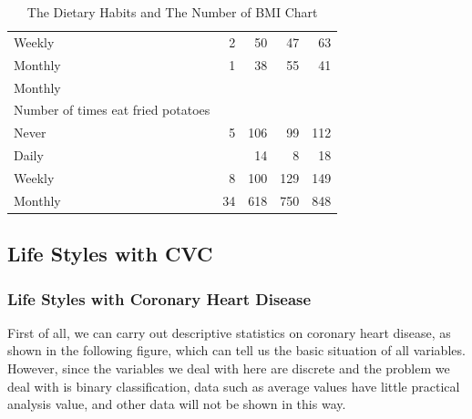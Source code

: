 \documentclass{article}
\begin{document}
\begin{table}[!h]
{\begin{tabular}{lllll}
			\multicolumn{1}{l}{\hspace{5em}Weekly} &
			\multicolumn{1}{|r}{2} &
			\multicolumn{1}{r}{50} &
			\multicolumn{1}{r}{47} &
			\multicolumn{1}{r}{63} \\
			\multicolumn{1}{l}{\hspace{5em}Monthly} &
			\multicolumn{1}{|r}{1} &
			\multicolumn{1}{r}{38} &
			\multicolumn{1}{r}{55} &
			\multicolumn{1}{r}{41} \\
			\multicolumn{1}{l}{\hspace{3em}Monthly} &
			\multicolumn{1}{|r}{} &
			\multicolumn{1}{r}{} &
			\multicolumn{1}{r}{} &
			\multicolumn{1}{r}{} \\
			\multicolumn{1}{l}{\hspace{4em}Number of times eat fried potatoes} &
			\multicolumn{1}{|r}{} &
			\multicolumn{1}{r}{} &
			\multicolumn{1}{r}{} &
			\multicolumn{1}{r}{} \\
			\multicolumn{1}{l}{\hspace{5em}Never} &
			\multicolumn{1}{|r}{5} &
			\multicolumn{1}{r}{106} &
			\multicolumn{1}{r}{99} &
			\multicolumn{1}{r}{112} \\
			\multicolumn{1}{l}{\hspace{5em}Daily} &
			\multicolumn{1}{|r}{} &
			\multicolumn{1}{r}{14} &
			\multicolumn{1}{r}{8} &
			\multicolumn{1}{r}{18} \\
			\multicolumn{1}{l}{\hspace{5em}Weekly} &
			\multicolumn{1}{|r}{8} &
			\multicolumn{1}{r}{100} &
			\multicolumn{1}{r}{129} &
			\multicolumn{1}{r}{149} \\
			\multicolumn{1}{l}{\hspace{5em}Monthly} &
			\multicolumn{1}{|r}{34} &
			\multicolumn{1}{r}{618} &
			\multicolumn{1}{r}{750} &
			\multicolumn{1}{r}{848} \\
			\cline{1-5}
		\end{tabular}
	}
	\caption{The Dietary Habits and The Number of BMI Chart}
	\label{tab:t6}
\end{table}	

\newpage

\subsection{Life Styles with CVC}
\subsubsection{Life Styles with Coronary Heart Disease}
First of all, we can carry out descriptive statistics on coronary heart disease, as shown in the following figure, which can tell us the basic situation of all variables. However, since the variables we deal with here are discrete and the problem we deal with is binary classification, data such as average values have little practical analysis value, and other data will not be shown in this way.
\end{document}
